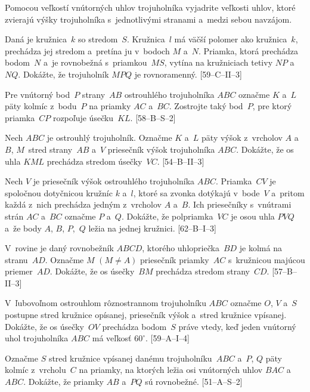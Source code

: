 {Pomocou veľkostí vnútorných uhlov trojuholníka vyjadrite veľkosti uhlov, ktoré zvierajú
výšky trojuholníka s~jednotlivými stranami a~medzi sebou navzájom.

Daná je kružnica~$k$ so stredom~$S$. Kružnica~$l$ má väčší polomer ako kružnica~$k$,
prechádza jej stredom a~pretína ju v~bodoch $M$ a~$N$. Priamka, ktorá prechádza bodom~$N$
a~je rovnobežná s~priamkou~$MS$, vytína na kružniciach tetivy $NP$ a~$NQ$. Dokážte, že
trojuholník $MPQ$ je rovnoramenný.
[59--C--II--3]

Pre vnútorný bod~$P$ strany~$AB$ ostrouhlého trojuholníka $ABC$ označme $K$ a~$L$ päty
kolmíc z~bodu~$P$ na priamky $AC$ a~$BC$. Zostrojte taký bod~$P$, pre ktorý priamka~$CP$
rozpoľuje úsečku~$KL$.
[58--B--S--2]

Nech $ABC$ je ostrouhlý trojuholník. Označme $K$ a~$L$ päty výšok z~vrcholov $A$
a~$B$, $M$~stred strany~$AB$ a~$V$ priesečník výšok trojuholníka $ABC$. Dokážte, že os uhla $KML$
prechádza stredom úsečky~$VC$.
[54--B--II--3]

\D
Nech $V$ je priesečník výšok ostrouhlého trojuholníka $ABC$. Priamka~$CV$ je
spoločnou dotyčnicou kružníc $k$ a~$l$, ktoré sa zvonka dotýkajú v~bode~$V$
a~pritom každá z~nich prechádza jedným z~vrcholov $A$ a~$B$. Ich priesečníky
s~vnútrami strán $AC$ a~$BC$ označme $P$ a~$Q$.
Dokážte, že polpriamka~$VC$ je osou uhla $PVQ$ a~že body $A$, $B$, $P$,~$Q$ ležia na jednej kružnici.
[62--B--I--3]

V~rovine je daný rovnobežník $ABCD$, ktorého uhlopriečka~$BD$ je kolmá na stranu~$AD$. Označme $M$ $(M\ne A)$ priesečník priamky~$AC$ s~kružnicou majúcou priemer~$AD$. Dokážte, že os úsečky~$BM$ prechádza stredom strany~$CD$.
[57--B--II--3]

V~ľubovoľnom ostrouhlom rôznostrannom trojuholníku $ABC$ označme $O$, $V$ a~$S$ postupne stred kružnice opísanej, priesečník výšok a~stred kružnice vpísanej. Dokážte, že os
úsečky~$OV$ prechádza bodom~$S$ práve vtedy, keď jeden vnútorný uhol trojuholníka $ABC$ má
veľkosť $60^\circ$.
[59--A--I--4]

Označme $S$ stred kružnice vpísanej danému trojuholníku~$ABC$ a~$P$, $Q$ päty
kolmíc z~vrcholu~$C$ na priamky, na ktorých ležia osi vnútorných uhlov $BAC$ a~$ABC$.
Dokážte, že priamky $AB$ a~$PQ$ sú rovnobežné.
[51--A--S--2]
}

